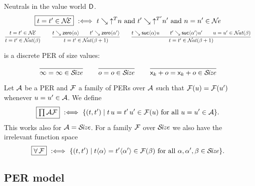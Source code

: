 \documentclass[acmlarge,review,anonymous]{acmart}\settopmatter{printfolios=true}
\begin{document}
Neutrals in the value world $\mathsf{D}$.
\[
\fbox{$t = t' \in \mathcal{N}\!\mathcal{E}$} \mathrel{\ :\Longleftrightarrow\ }
  t \searrow \mathord{\uparrow^{T}} n \ \mbox{and}\  t' \searrow \mathord{\uparrow^{T'}}{n'} \ \mbox{and}\ 
  n = n' \in \mathcal{N}\!\mathit{e}
\]
\fbox{$\NAT(\alpha)$}
\begin{gather*}
  \ru{%
      t = t' \in \NEE
    }{t = t' \in \NAT(\beta)}
\qquad
  \ru{t \evalsto \zero \alpha \qquad
      t' \evalsto \zero{\alpha'}
    }{t = t' \in \NAT(\beta+1)}
\qquad
  \ru{t \evalsto \suc \alpha u \qquad
      t' \evalsto \suc {\alpha'} {u'} \qquad
      u = u' \in \NAT(\beta)
    }{t = t' \in \NAT(\beta+1)}
\end{gather*}

\fbox{$\SIZE$} is a discrete PER of size values:
\begin{gather*}
  \ru{
    }{\infty = \infty \in \SIZE}
\qquad
  \ru{
    }{o = o \in \SIZE}
\qquad
  \ru{
    }{\lev k + o = \lev k + o \in \SIZE}
\end{gather*}

Let $\mathcal{A}$ be a PER and $\mathcal{F}$ a family of PERs over $\mathcal{A}$ such that
$\mathcal{F}(u) = \mathcal{F}(u')$ whenever $u = u' \in \mathcal{A}$.  We define
\[
  \fbox{$\prod\mathcal{A}\mathcal{F}$} \mathrel{\ :\Longleftrightarrow\ } \{(t,t') \mid t\,u = t'\,u' \in \mathcal{F}(u) \ \mbox{for all}\  u = u' \in \mathcal{A} \}
  .
\]
This works also for $\mathcal{A} = \mathcal{S}\!\mathit{ize}$.
For a family $\mathcal{F}$ over $\SIZE$ we also have the irrelevant function space
\[
  \fbox{$\forall\,\mathcal{F}$} \mathrel{\ :\Longleftrightarrow\ }
  \{(t,t') \mid t \langle\alpha\rangle = t' \langle\alpha'\rangle \in \mathcal{F}(\beta) \ \mbox{for all}\  \alpha,\alpha',\beta \in \mathcal{S}\!\mathit{ize} \}
  .
\]




\subsection{PER model}
\label{sec:permode}
\end{document}
